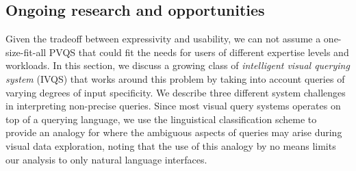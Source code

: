 \subsection{Ongoing research and opportunities}
\par Given the tradeoff between expressivity and usability, we can not assume a one-size-fit-all PVQS that could fit the needs for users of different expertise levels and workloads. In this section, we discuss a growing class of \textit{intelligent visual querying system} (IVQS) that works around this problem by taking into account queries of varying degrees of input specificity. We describe three different system challenges in interpreting non-precise queries. Since most visual query systems operates on top of a querying language, we use the linguistical classification scheme to provide an analogy for where the ambiguous aspects of queries may arise during visual data exploration, noting that the use of this analogy by no means limits our analysis to only natural language interfaces.

